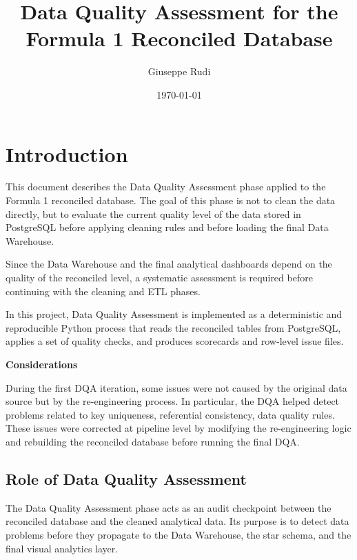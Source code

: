 \documentclass[a4paper,11pt]{article}
\title{Data Quality Assessment for the Formula 1 Reconciled Database}
\author{Giuseppe Rudi}
\date{\today}
\begin{document}
	
	\maketitle
	
	\tableofcontents
	\newpage
	
	\section{Introduction}
	
	This document describes the Data Quality Assessment phase applied to the Formula 1 reconciled database.
	The goal of this phase is not to clean the data directly, but to evaluate the current quality level of the data stored in PostgreSQL before applying cleaning rules and before loading the final Data Warehouse.
	
	
	Since the Data Warehouse and the final analytical dashboards depend on the quality of the reconciled level, a systematic assessment is required before continuing with the cleaning and ETL phases.
	
	In this project, Data Quality Assessment is implemented as a deterministic and reproducible Python process that reads the reconciled tables from PostgreSQL, applies a set of quality checks, and produces scorecards and row-level issue files.
	
	\vspace{2em}
	\textbf{Considerations}
	
	During the first DQA iteration, some issues were not caused by the original data source but by the re-engineering process. In particular, the DQA helped detect problems related to key uniqueness, referential consistency, data quality rules. These issues were corrected at pipeline level by modifying the re-engineering logic and rebuilding the reconciled database before running the final DQA.
	
	\subsection{Role of Data Quality Assessment}
	
	The Data Quality Assessment phase acts as an audit checkpoint between the reconciled database and the cleaned analytical data.
	Its purpose is to detect data problems before they propagate to the Data Warehouse, the star schema, and the final visual analytics layer.
	
\end{document}
